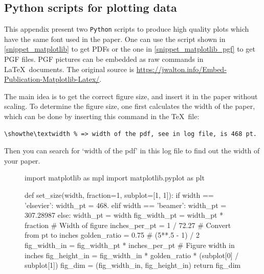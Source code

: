 \documentclass[authoryear,3p,times,preprint,review,fleqn]{elsarticle}
\numberwithin{equation}{section}
\theoremstyle{remark}
\begin{document}
\begin{appendices}
%

\section{Python scripts for plotting data}\label{sec:scripts}

This appendix present two \texttt{Python} scripts to produce high quality plots which have the same font used in the paper. One can use the script shown in \cref{snippet_matplotlib} to get PDFs or the one in \cref{snippet_matplotlib_pgf} to get PGF files. PGF pictures can be embedded as raw commands in \LaTeX\ documents. The original source is \url{https://jwalton.info/Embed-Publication-Matplotlib-Latex/}.

The main idea is to get the correct figure size, and insert it in the paper without scaling. To determine the figure size, one first calculates the width of the paper, which can be done by inserting this command in the \TeX\ file:


\begin{verbatim}
\showthe\textwidth % => width of the pdf, see in log file, is 468 pt. 
\end{verbatim}
Then you can search for `width of the pdf' in this log file to find out the width of your paper.

\begin{figure}[!h]
  \begin{snippet}[caption={Python script for plotting data.},label={snippet_matplotlib},framerule=1pt,tabsize=3]   
    import matplotlib as mpl
    import matplotlib.pyplot as plt

    def set_size(width, fraction=1, subplot=[1, 1]):
        if width == 'elsevier':
            width_pt = 468.
        elif width == 'beamer':
            width_pt = 307.28987
        else:
            width_pt = width
        fig_width_pt = width_pt * fraction      # Width of figure
        inches_per_pt = 1 / 72.27               # Convert from pt to inches
        golden_ratio = 0.75                     # (5**.5 - 1) / 2
        fig_width_in = fig_width_pt * inches_per_pt  # Figure width in inches
        fig_height_in = fig_width_in * golden_ratio * (subplot[0] / subplot[1])
        fig_dim = (fig_width_in, fig_height_in)
        return fig_dim


\end{snippet}
\end{figure}
\end{appendices}
\end{document}
